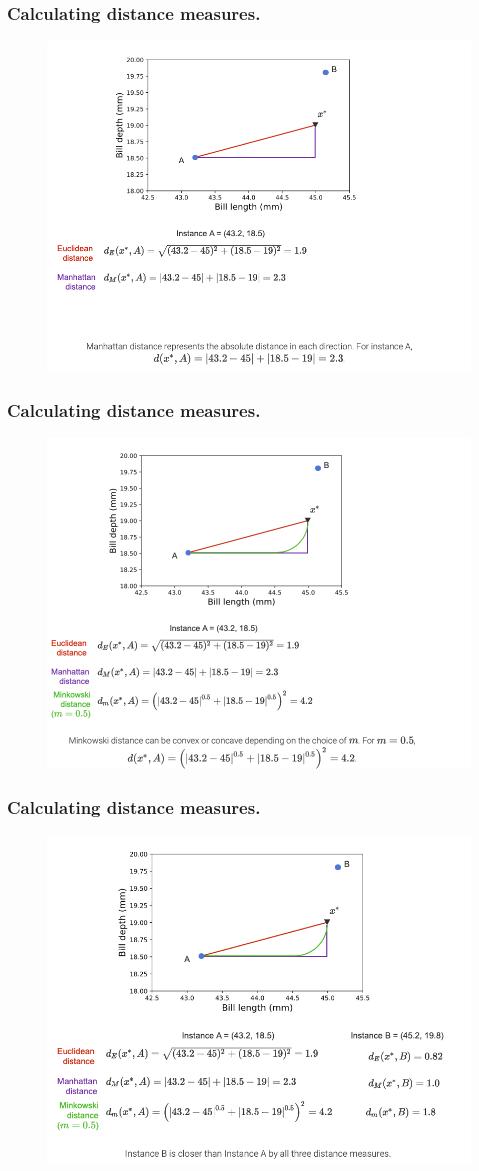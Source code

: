 \documentclass[8pt,dvipsnames]{beamer}
\begin{document}
\begin{frame}
	\frametitle{Calculating distance measures.}
	\begin{figure}[ht]
		\centering
		\includegraphics[width=0.7\linewidth]{imgs/knn_35.png}
	\end{figure}
\end{frame}
\begin{frame}
	\frametitle{Calculating distance measures.}
	\begin{figure}[ht]
		\centering
		\includegraphics[width=0.7\linewidth]{imgs/knn_36.png}
	\end{figure}
\end{frame}
\begin{frame}
	\frametitle{Calculating distance measures.}
	\begin{figure}[ht]
		\centering
		\includegraphics[width=0.7\linewidth]{imgs/knn_37.png}
	\end{figure}
\end{frame}
\end{document}
